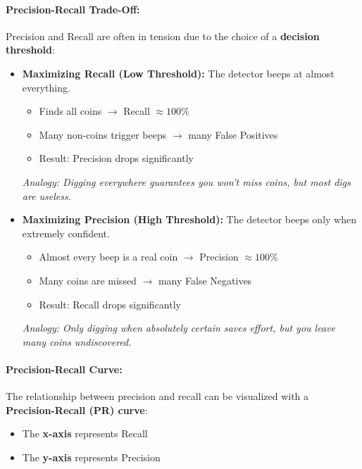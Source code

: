 \documentclass[12pt]{article}
\begin{document}
\paragraph{Precision-Recall Trade-Off:}

Precision and Recall are often in tension due to the choice of a \textbf{decision threshold}:

\begin{itemize}
    \item \textbf{Maximizing Recall (Low Threshold):} The detector beeps at almost everything.
          \begin{itemize}
              \item Finds all coins $\rightarrow$ Recall $\approx 100\%$
              \item Many non-coins trigger beeps $\rightarrow$ many False Positives
              \item Result: Precision drops significantly
          \end{itemize}
          \textit{Analogy: Digging everywhere guarantees you won't miss coins, but most digs are useless.}

    \item \textbf{Maximizing Precision (High Threshold):} The detector beeps only when extremely confident.
          \begin{itemize}
              \item Almost every beep is a real coin $\rightarrow$ Precision $\approx 100\%$
              \item Many coins are missed $\rightarrow$ many False Negatives
              \item Result: Recall drops significantly
          \end{itemize}
          \textit{Analogy: Only digging when absolutely certain saves effort, but you leave many coins undiscovered.}
\end{itemize}

\paragraph{Precision-Recall Curve:}

The relationship between precision and recall can be visualized with a \textbf{Precision-Recall (PR) curve}:

\begin{itemize}
    \item The \textbf{x-axis} represents Recall
    \item The \textbf{y-axis} represents Precision
\end{itemize}
\end{document}

